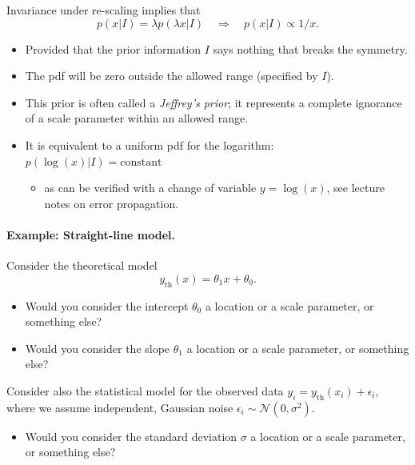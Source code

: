 \documentclass[%
oneside,                 %
final,                   %
10pt]{article}
\begin{document}
Invariance under re-scaling implies that
\[
p(x|I) = \lambda p(\lambda x|I) \quad \Rightarrow \quad p(x|I) \propto 1/x.
\]

\begin{itemize}
\item Provided that the prior information $I$ says nothing that breaks the symmetry.

\item The pdf will be zero outside the allowed range (specified by $I$).

\item This prior is often called a \emph{Jeffrey's prior}; it represents a complete ignorance of a scale parameter within an allowed range.

\item It is equivalent to a uniform pdf for the logarithm: $p(\log(x)|I) = \mathrm{constant}$
\begin{itemize}

  \item as can be verified with a change of variable $y=\log(x)$, see lecture notes on error propagation.
\end{itemize}

\noindent
\end{itemize}

\noindent
\paragraph{Example: Straight-line model.}
Consider the theoretical model 
\[
y_\mathrm{th}(x) = \theta_1  x  + \theta_0.
\]

\begin{itemize}
\item Would you consider the intercept $\theta_0$ a location or a scale parameter, or something else?

\item Would you consider the slope $\theta_1$ a location or a scale parameter, or something else?
\end{itemize}

\noindent
Consider also the statistical model for the observed data $y_i = y_\mathrm{th}(x_i) + \epsilon_i$, where we assume independent, Gaussian noise $\epsilon_i \sim \mathcal{N}(0, \sigma^2)$.
\begin{itemize}
\item Would you consider the standard deviation $\sigma$ a location or a scale parameter, or something else?
\end{itemize}
\end{document}
